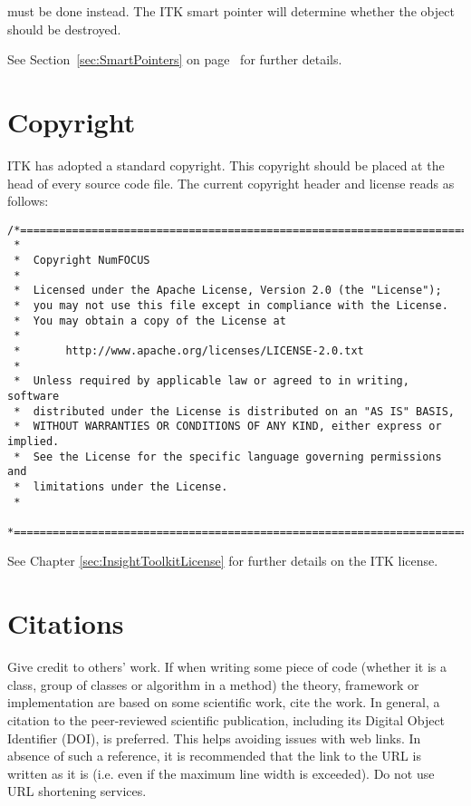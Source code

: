 must be done instead. The ITK smart pointer will determine whether the object
should be destroyed.

See Section~\ref{sec:SmartPointers} on page~\pageref{sec:SmartPointers} for
further details.


\section{Copyright}
\label{sec:Copyright}

ITK has adopted a standard copyright. This copyright should be placed at the
head of every source code file. The current copyright header and license reads
as follows:

\small
\begin{verbatim}
/*=========================================================================
 *
 *  Copyright NumFOCUS
 *
 *  Licensed under the Apache License, Version 2.0 (the "License");
 *  you may not use this file except in compliance with the License.
 *  You may obtain a copy of the License at
 *
 *       http://www.apache.org/licenses/LICENSE-2.0.txt
 *
 *  Unless required by applicable law or agreed to in writing, software
 *  distributed under the License is distributed on an "AS IS" BASIS,
 *  WITHOUT WARRANTIES OR CONDITIONS OF ANY KIND, either express or implied.
 *  See the License for the specific language governing permissions and
 *  limitations under the License.
 *
 *=========================================================================*/
\end{verbatim}
\normalsize

See Chapter \ref{sec:InsightToolkitLicense} for further details on the ITK
license.


\section{Citations}
\label{sec:Citations}

Give credit to others' work. If when writing some piece of code (whether it is a
class, group of classes or algorithm in a method) the theory, framework or
implementation are based on some scientific work, cite the work. In general, a
citation to the peer-reviewed scientific publication, including its Digital
Object Identifier (DOI), is preferred. This helps avoiding issues with web
links. In absence of such a reference, it is recommended that the link to the
URL is written as it is (i.e. even if the maximum line width is exceeded). Do
not use URL shortening services.

